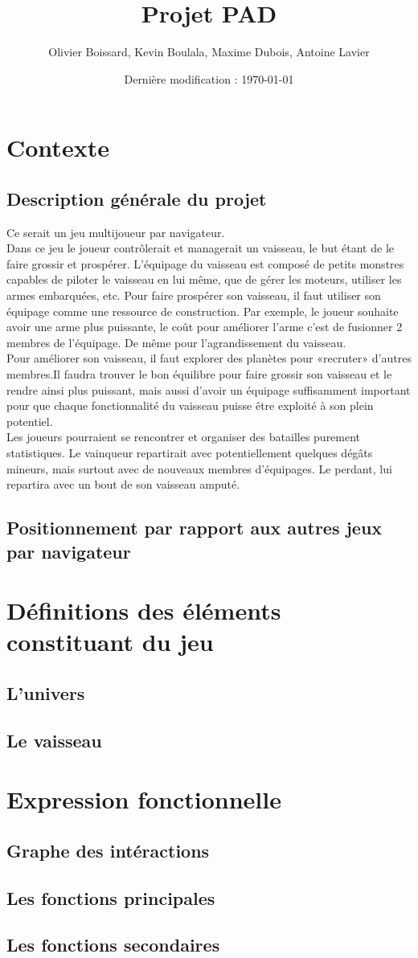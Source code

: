 \documentclass[a4paper,11pt]{report}
\title{Projet PAD}
\author{Olivier Boissard, Kevin Boulala, Maxime Dubois, Antoine Lavier}
\date{Dernière modification : \today}
\begin{document}
\maketitle
\tableofcontents

\chapter{Contexte}
\section{Description générale du projet}
Ce serait un jeu multijoueur par navigateur.\\
Dans ce jeu le joueur contrôlerait et managerait un vaisseau, le but étant de le faire grossir et prospérer.
L’équipage du vaisseau est composé de petits monstres capables de piloter le vaisseau en lui même, que de gérer les moteurs, utiliser les armes embarquées, etc. Pour faire prospérer son vaisseau, il faut utiliser son équipage comme une ressource de construction. Par exemple, le joueur souhaite avoir une arme plus puissante, le coût pour améliorer l’arme c’est de fusionner 2 membres de l’équipage. De même pour l’agrandissement du vaisseau.\\
Pour améliorer son vaisseau, il faut explorer des planètes pour «recruter» d’autres membres.Il faudra trouver le bon équilibre pour faire grossir son vaisseau et le rendre ainsi plus puissant, mais aussi d’avoir un équipage suffisamment important pour que chaque fonctionnalité du vaisseau puisse être exploité à son plein potentiel.\\
Les joueurs pourraient se rencontrer et organiser des batailles purement statistiques. Le vainqueur repartirait avec potentiellement quelques dégâts mineurs, mais surtout avec de nouveaux membres d’équipages. Le perdant, lui repartira avec un bout de son vaisseau amputé.
\section{Positionnement par rapport aux autres jeux par navigateur}
\chapter{Définitions des éléments constituant du jeu}
\section{L'univers}
\section{Le vaisseau}
\chapter{Expression fonctionnelle}
\section{Graphe des intéractions}
\section{Les fonctions principales}
\section{Les fonctions secondaires}
\end{document}
